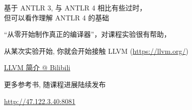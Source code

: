 \begin{frame}{}
  \begin{columns}
  \end{columns}

  \vspace{0.50cm}
  \begin{center}
    基于 ANTLR 3, 与 ANTLR 4 相比有些过时，\\[3pt]
    但可以看作理解 ANTLR 4 的基础
  \end{center}
\end{frame}

\begin{frame}{}
  \begin{center}
    ``从零开始制作真正的编译器''，对课程实验很有帮助，
  \end{center}
\end{frame}

\begin{frame}{}

  \begin{center}
    从某次实验开始, 你就会开始接触 LLVM (\url{https://llvm.org/})
  \end{center}
\end{frame}

\begin{frame}{}

  \vspace{0.20cm}
  \begin{center}
    \href{https://www.bilibili.com/video/BV1RF411K7F5/?vd_source=e3cbbf5ca80db268fa006d63626e267e}{LLVM 简介 @ Bilibili}
  \end{center}
\end{frame}

\begin{frame}{}
  \begin{center}

    \vspace{0.50cm}
    更多参考书, 随课程进展陆续发布

    \vspace{0.30cm}
    \url{http://47.122.3.40:8081}
  \end{center}
\end{frame}
